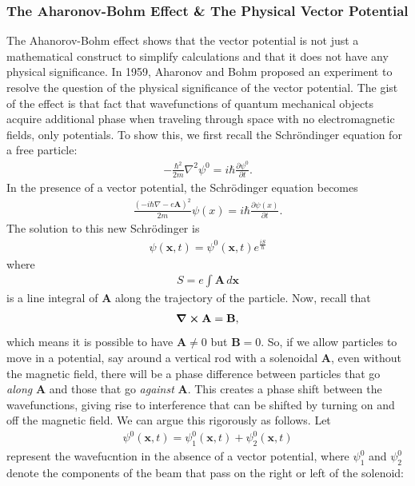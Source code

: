 \documentclass[a4paper,11pt]{article}
\numberwithin{equation}{section}
\theoremstyle{definition}
\newcommand{\p}{\partial}
\begin{document}
\subsubsection{The Aharonov-Bohm Effect \& The Physical Vector Potential}
The Ahanorov-Bohm effect shows that the vector potential is not just a mathematical construct to simplify calculations and that it does not have any physical significance. In 1959, Aharonov and Bohm proposed an experiment to resolve the question of the physical significance of the vector potential. The gist of the effect is that fact that wavefunctions of quantum mechanical objects acquire additional phase when traveling through space with no electromagnetic fields, only potentials. To show this, we first recall the Schr\"ondinger equation for a free particle:
\begin{align}
-\frac{\hbar^2}{2m}\nabla^2 \psi^0 = i\hbar \frac{\p \psi^0}{\p t}.
\end{align}
In the presence of a vector potential, the Schr\"odinger equation becomes
\begin{align}
\frac{(-i\hbar\nabla - e\mathbf{A})^2}{2m} \psi(x) = i\hbar \frac{\p \psi(x)}{\p t}.
\end{align}
The solution to this new Schr\"odinger is
\begin{align}
\psi(\mathbf{x},t) = \psi^0(\mathbf{x},t)e^{\frac{iS}{\hbar}}
\end{align}
where
\begin{align}
S = e\int \mathbf{A}\,d\mathbf{x}
\end{align}
is a line integral of $\mathbf{A}$ along the trajectory of the particle. Now, recall that
\begin{align}
\curl{\mathbf{A}} = \mathbf{B},
\end{align}
which means it is possible to have $\mathbf{A} \neq 0$ but $\mathbf{B} = 0$. So, if we allow particles to move in a potential, say around a vertical rod with a solenoidal $\mathbf{A}$, even without the magnetic field, there will be a phase difference between particles that go \textit{along} $\mathbf{A}$ and those that go \textit{against} $\mathbf{A}$. This creates a phase shift between the wavefunctions, giving rise to interference that can be shifted by turning on and off the magnetic field. We can argue this rigorously as follows. Let
\begin{align}
\psi^0(\mathbf{x},t) = \psi_1^0(\mathbf{x},t) + \psi_2^0(\mathbf{x},t)
\end{align}
represent the wavefucntion in the absence of a vector potential, where $\psi^0_1$ and $\psi^0_2$ denote the components of the beam that pass on the right or left of the solenoid:
\end{document}
